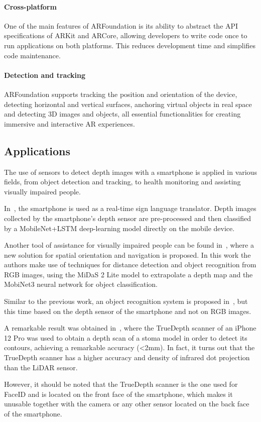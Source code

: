 \paragraph{Cross-platform}
One of the main features of ARFoundation is its ability to abstract the API
specifications of ARKit and ARCore, allowing developers to write code once to run applications on both platforms.
This reduces development time and simplifies code maintenance.

\paragraph{Detection and tracking}
ARFoundation supports tracking the position and orientation of the device, detecting horizontal and
vertical surfaces, anchoring virtual objects in real space and detecting 3D images and objects,
all essential functionalities for creating immersive and interactive AR experiences.

\subsection{Applications}\label{subsec:applications}
The use of sensors to detect depth images with a smartphone is applied in various fields,
from object detection and tracking, to health monitoring and assisting visually impaired people.

In~\cite{real-time-sign-language-translation}, the smartphone is used as a real-time sign language translator.
Depth images collected by the smartphone's depth sensor are pre-processed
and then classified by a MobileNet+LSTM deep-learning model directly on the mobile device.

Another tool of assistance for visually impaired people can be found in~\cite{smartphone-visual-assistance-system},
where a new solution for spatial orientation and navigation is proposed.
In this work the authors make use of techniques for distance detection and object recognition from RGB images,
using the MiDaS 2 Lite model to extrapolate a depth map and the MobiNet3 neural network for object classification.

Similar to the previous work, an object recognition system is proposed in~\cite{object-detection-using-smartphone},
but this time based on the depth sensor of the smartphone and not on RGB images.

A remarkable result was obtained in~\cite{smartphone-depth-for-medical-applications},
where the TrueDepth scanner of an iPhone 12 Pro was used to obtain a depth scan of
a stoma model in order to detect its contours, achieving a remarkable accuracy (<2mm).
In fact, it turns out that the TrueDepth scanner has a higher
accuracy and density of infrared dot projection than the LiDAR sensor.

However, it should be noted that the TrueDepth scanner is the one used
for FaceID and is located on the front face of the smartphone,
which makes it unusable together with the camera or any other sensor located on the back face of the smartphone.
